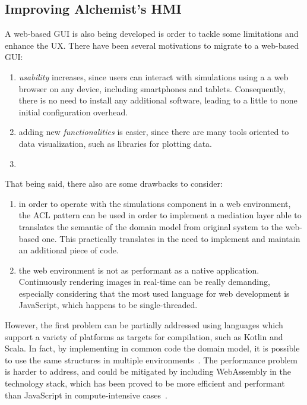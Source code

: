 \documentclass[conference]{IEEEtran}
\begin{document}
\subsection{Improving Alchemist's \ac{HMI}}
A web-based \ac{GUI} is also being developed is order to tackle some limitations and enhance the \ac{UX}.
%
There have been several motivations to migrate to a web-based \ac{GUI}:
\begin{enumerate}
    \item \emph{usability} increases,
    since users can interact with simulations using a a web browser on any device,
    including smartphones and tablets.
    Consequently,
    there is no need to install any additional software,
    leading to a little to none initial configuration overhead.
    \item adding new \emph{functionalities} is easier,
    since there are many tools oriented to data visualization,
    such as libraries for plotting data.
    \item
\end{enumerate}
That being said,
there also are some drawbacks to consider:
\begin{enumerate}
    \item in order to operate with the simulations component in a web environment,
    the \ac{ACL} pattern can be used in order to implement a mediation layer able to translates the semantic of the domain model from original system to the web-based one.
    This practically translates in the need to implement and maintain an additional piece of code.
    \item the web environment is not as performant as a native application.
    Continuously rendering images in real-time can be really demanding,
    especially considering that the most used language for web development is JavaScript,
    which happens to be single-threaded.
\end{enumerate}

However,
the first problem can be partially addressed using languages which support a variety of platforms as targets for compilation,
such as Kotlin and Scala.
%
In fact,
by implementing in common code the domain model,
it is possible to use the same structures in multiple environments~\cite{DBLP:conf/dais/FilasetaP23}.
%
The performance problem is harder to address,
and could be mitigated by including WebAssembly in the technology stack,
which has been proved to be more efficient and performant than JavaScript in compute-intensive cases~\cite{DBLP:conf/ict4s/Macedo0PS22}.
%
\end{document}
